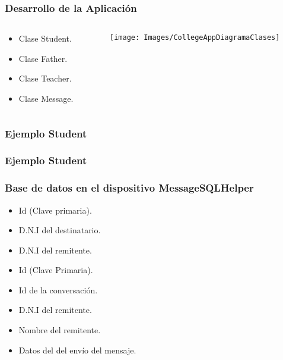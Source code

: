 \begin{frame}
	\frametitle{Desarrollo de la Aplicación}
	\begin{columns}
		\begin{column}{0.3\textwidth}
			\begin{itemize}
				\item Clase {\ttfamily Student}.
				\item Clase {\ttfamily Father}.
				\item Clase {\ttfamily Teacher}.
				\item Clase {\ttfamily Message}.
			\end{itemize}
			\endblock{}
		\end{column}
		\begin{column}{0.7\textwidth}
			\vfill 
			\begin{center}
				\texttt{[image: Images/CollegeAppDiagramaClases]}
			\end{center}
		\end{column}
	\end{columns}
\end{frame}


\begin{frame}
	\frametitle{Ejemplo {\ttfamily Student}}
	
\end{frame}


\begin{frame}
	\frametitle{Ejemplo {\ttfamily Student}}
	
\end{frame}


\begin{frame}
	\frametitle{Base de datos en el dispositivo {\ttfamily MessageSQLHelper}}
		\begin{itemize}
			\item Id (Clave primaria).
			\item D.N.I del destinatario.
			\item D.N.I del remitente.
		\end{itemize}
	\endblock{}
		\begin{itemize}
			\item Id (Clave Primaria).
			\item Id de la conversación.
			\item D.N.I del remitente.
			\item Nombre del remitente.
			\item Datos del del envío del mensaje.
		\end{itemize}
	\endblock{}
\end{frame}

